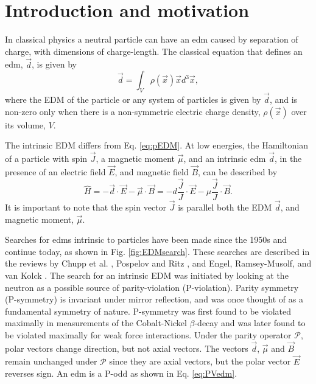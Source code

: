 \chapter {Introduction and motivation}

In classical physics a neutral particle can have an \gls{edm} caused by separation of charge, with dimensions of charge-length. The classical equation that defines an \gls{edm}, $\vec{d}$, is given by
\begin{equation}\label{eq:pEDM}
    \vec{d} = \int_V \rho (\vec{x})\vec{x} d^3\vec{x},
\end{equation}
where the EDM of the particle or any system of particles is given by $\vec{d}$, and is non-zero only when there is a non-symmetric electric charge density, $\rho(\vec{x})$ over its volume, $V$.

The intrinsic EDM differs from Eq. \ref{eq:pEDM}. At low energies, the Hamiltonian of a particle with spin $\vec{J}$, a magnetic moment $\vec{\mu}$, and an intrinsic \gls{edm} $\vec{d}$, in the presence of an electric field $\vec{E}$, and magnetic field $\vec{B}$, can be described by
\begin{equation} \label{eq:hamiltonian}
    \hat{H} = -\vec{d} \cdot \vec{E} - \vec{\mu} \cdot \vec{B}=-d \frac{\vec{J}}{J}\cdot \vec{E} - \mu \frac{\vec{J}}{J}\cdot \vec{B}.
\end{equation}
It is important to note that the spin vector $\vec{J}$ is parallel both the EDM $\vec{d}$, and magnetic moment, $\vec{\mu}$. 

Searches for \gls{edm}s intrinsic to particles have been made since the 1950s and continue today, as shown in Fig. \ref{fig:EDMsearch}. These searches are described in the reviews by Chupp et al. \cite{Chupp2019}, Pospelov and Ritz \cite{Pospelov2005}, and Engel, Ramsey-Musolf, and van Kolck \cite{Engel2013}. The search for an intrinsic EDM was initiated by looking at the neutron as a possible source of parity-violation (P-violation). Parity symmetry (P-symmetry) is invariant under mirror reflection, and was once thought of as a fundamental symmetry of nature. P-symmetry was first found to be violated maximally in measurements of the Cobalt-Nickel $\beta$-decay and was later found to be violated maximally for weak force interactions. Under the parity operator $\mathcal{P}$, polar vectors change direction, but not axial vectors. The vectors $\vec{d}$, $\vec{\mu}$ and $\vec{B}$ remain unchanged under $\mathcal{P}$ since they are axial vectors, but the polar vector $\vec{E}$ reverses sign. An \gls{edm} is a P-odd as shown in Eq. \ref{eq:PVedm}.

